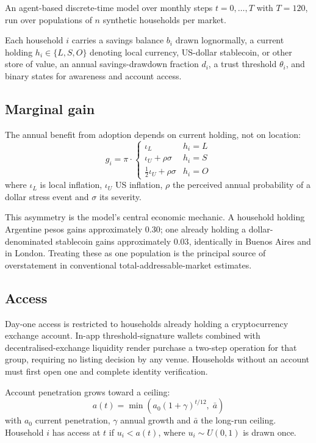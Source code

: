 \documentclass[11pt,a4paper]{article}
\begin{document}
An agent-based discrete-time model over monthly steps $t = 0, \dots, T$ with
$T = 120$, run over populations of $n$ synthetic households per market.

Each household $i$ carries a savings balance $b_i$ drawn lognormally, a
current holding $h_i \in \{L, S, O\}$ denoting local currency, US-dollar
stablecoin, or other store of value, an annual savings-drawdown fraction
$d_i$, a trust threshold $\theta_i$, and binary states for awareness and
account access.

\subsection{Marginal gain}

The annual benefit from adoption depends on current holding, not on
location:
\begin{equation}
g_i =
\pi \cdot
\begin{cases}
\iota_L & h_i = L\\[2pt]
\iota_U + \rho\sigma & h_i = S\\[2pt]
\tfrac{1}{2}\iota_U + \rho\sigma & h_i = O
\end{cases}
\end{equation}
where $\iota_L$ is local inflation, $\iota_U$ US inflation, $\rho$ the
perceived annual probability of a dollar stress event and $\sigma$ its
severity.

This asymmetry is the model's central economic mechanic. A household holding
Argentine pesos gains approximately $0.30$; one already holding a
dollar-denominated stablecoin gains approximately $0.03$, identically in
Buenos Aires and in London. Treating these as one population is the
principal source of overstatement in conventional total-addressable-market
estimates.

\subsection{Access}

Day-one access is restricted to households already holding a cryptocurrency
exchange account. In-app threshold-signature wallets combined with
decentralised-exchange liquidity render purchase a two-step operation for
that group, requiring no listing decision by any venue. Households without
an account must first open one and complete identity verification.

Account penetration grows toward a ceiling:
\begin{equation}
a(t) = \min\!\left(a_0 (1+\gamma)^{t/12},\; \bar{a}\right)
\end{equation}
with $a_0$ current penetration, $\gamma$ annual growth and $\bar{a}$ the
long-run ceiling. Household $i$ has access at $t$ if $u_i < a(t)$, where
$u_i \sim U(0,1)$ is drawn once.
\end{document}
